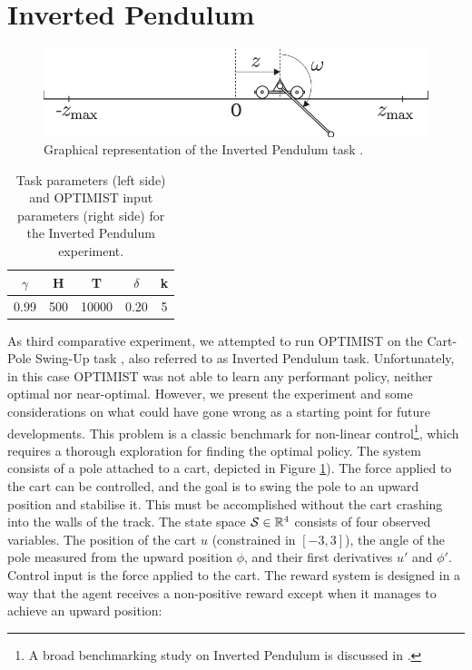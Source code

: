 
\section{Inverted Pendulum}

\begin{figure}[t!] 
\centering
\includegraphics[width=.8\textwidth,keepaspectratio]{Images/inverted_pendulum.png}
\caption{Graphical representation of the Inverted Pendulum task \cite{wawrzynski2005intensive}.} 
\label{fig:invpend}
\end{figure} 

\begin{table}
\centering
\begin{tabular}{ccc|cc} 
\toprule
$\gamma$ & H & T & $\delta$ & k\\ 
\midrule
0.99 & 500 & 10000 & 0.20 & 5\\
\bottomrule
\end{tabular}
\caption{Task parameters (left side) and \gls{OPTIMIST} input parameters (right side) for the Inverted Pendulum experiment.}
\label{tab:IPcoeff}
\end{table}

As third comparative experiment, we attempted to run \gls{OPTIMIST} on the Cart-Pole Swing-Up task \cite{tornio2006variational}, also referred to as Inverted Pendulum task. Unfortunately, in this case \gls{OPTIMIST} was not able to learn any performant policy, neither optimal nor near-optimal. However, we present the experiment and some considerations on what could have gone wrong as a starting point for future developments.
This problem is a classic benchmark for non-linear control\footnote{A broad benchmarking study on Inverted Pendulum is discussed in \cite{duan2016benchmarking}.}, which requires a thorough exploration for finding the optimal policy. The system consists of a pole attached to a cart, depicted in Figure \ref{fig:invpend}). The force applied to the cart can be controlled, and the goal is to swing the pole to an  upward  position  and  stabilise  it.  This  must  be accomplished without the cart crashing into the walls of the track. The state space $\mathcal{S}\in\mathbb{R}^4$ consists of four observed variables. The position of the cart $u$ (constrained in $[-3,3]$), the angle  of  the  pole  measured  from  the upward  position $\phi$,  and  their  first  derivatives $u'$ and $\phi'$.  Control input is the force applied to the cart. The reward system is designed in a way that the agent receives a non-positive reward except when it manages to achieve an upward position:

